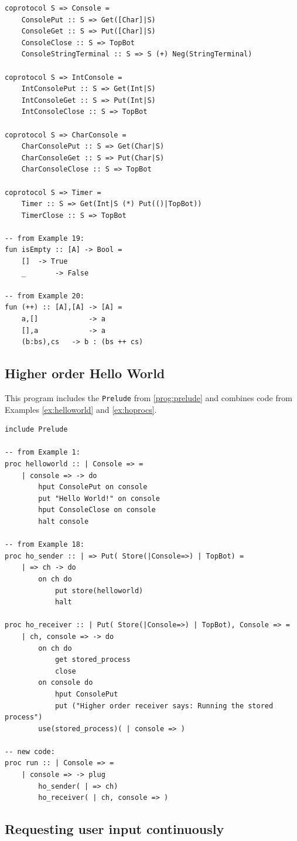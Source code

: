 \documentclass[11pt]{article}
\begin{document}
\begin{appendix}
\begin{lstlisting}
coprotocol S => Console =
    ConsolePut :: S => Get([Char]|S) 
    ConsoleGet :: S => Put([Char]|S) 
    ConsoleClose :: S => TopBot 
    ConsoleStringTerminal :: S => S (+) Neg(StringTerminal)

coprotocol S => IntConsole =
    IntConsolePut :: S => Get(Int|S) 
    IntConsoleGet :: S => Put(Int|S) 
    IntConsoleClose :: S => TopBot 

coprotocol S => CharConsole =
    CharConsolePut :: S => Get(Char|S) 
    CharConsoleGet :: S => Put(Char|S) 
    CharConsoleClose :: S => TopBot 

coprotocol S => Timer =
    Timer :: S => Get(Int|S (*) Put(()|TopBot))
    TimerClose :: S => TopBot

-- from Example 19:
fun isEmpty :: [A] -> Bool =
	[]	-> True
	_		-> False
	
-- from Example 20:
fun (++) :: [A],[A] -> [A] =
	a,[]			-> a
	[],a 			-> a
	(b:bs),cs	-> b : (bs ++ cs)  
\end{lstlisting}

\subsection{Higher order Hello World}
\label{prog:h.o.hello_world}

This program includes the \lstinline{Prelude} from \ref{prog:prelude} and combines code from Examples \ref{ex:helloworld} and \ref{ex:hoprocs}.

\begin{lstlisting}
include Prelude

-- from Example 1:
proc helloworld :: | Console => =
	| console => -> do
		hput ConsolePut on console
		put "Hello World!" on console
		hput ConsoleClose on console
		halt console

-- from Example 18:
proc ho_sender :: | => Put( Store(|Console=>) | TopBot) = 
	| => ch -> do
		on ch do
			put store(helloworld)	
			halt
			
proc ho_receiver :: | Put( Store(|Console=>) | TopBot), Console => =
	| ch, console => -> do
		on ch do
			get stored_process
			close
		on console do
			hput ConsolePut
			put ("Higher order receiver says: Running the stored process")
		use(stored_process)( | console => )

-- new code:
proc run :: | Console => = 
	| console => -> plug
		ho_sender( | => ch)
		ho_receiver( | ch, console => )
\end{lstlisting}


\subsection{Requesting user input continuously}
\label{prog:user_input_client_server}


\end{appendix}
\end{document}
